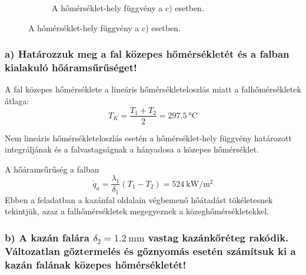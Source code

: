 \begin{figure}[h]
\begin{subfigure}[b]{0.32\textwidth}
		\caption{A hőmérséklet-hely függvény a c) esetben.}
	\end{subfigure}
\end{figure}

\subsubsection*{a) Határozzuk meg a fal közepes hőmérsékletét és a falban kialakuló hőáramsűrűséget!}

A fal közepes hőmérséklete a lineáris hőmérsékleteloszlás miatt a falhőmérsékletek átlaga:
\begin{equation}
	T_K = \frac{T_1 + T_2}{2} = \SI{297.5}{\celsius}
\end{equation}

Nem lineáris hőmérsékleteloszlás esetén a hőmérséklet-hely függvény határozott integráljának és a falvastagságnak a hányadosa a közepes hőmérséklet.

A hőáramsűrűség a falban
\begin{equation}
	\dot{q}_a = \frac{\lambda_1}{\delta_1} (T_1 - T_2) = \SI{524}{\kilo\watt\per\meter\squared}
\end{equation}
Ebben a feladatban a kazánfal oldalain végbemenő hőátadást tökéletesnek tekintjük, azaz a falhőmérsékletek megegyeznek a közeghőmérsékletekkel.

\subsubsection*{b) A kazán falára $\delta_2 = \SI{1.2}{\milli\meter}$ vastag kazánkőréteg rakódik. Változatlan gőztermelés és gőznyomás esetén számítsuk ki a kazán falának közepes hőmérsékletét!}

